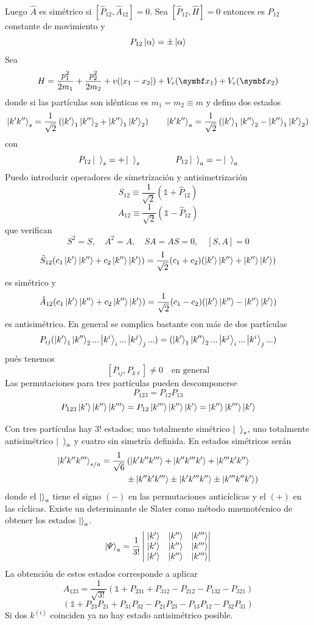 \documentclass[10pt,oneside]{CBFT_book}
\begin{document}
Luego $\hat{A}$ es simétrico si $[\hat{P}_{12},\hat{A}_{12}]=0$. Sea $[\hat{P}_{12},\hat{H}]=0$ entonces es 
$P_{12}$ constante de movimiento y 
\[
	P_{12} \Ket{\alpha} = \pm \Ket{\alpha}
\]
Sea 
\[
	H = \frac{p_1^2}{2m_1} + \frac{p_2^2}{2m_2} + v(|x_1 - x_2|) + V_e(\vb{x}_1)+ V_e(\vb{x}_2)
\]
donde si las partículas son idénticas es $m_1=m_2\equiv m$ y defino dos estados
\[
	\Ket{k' k''}_s = \frac{1}{\sqrt{2}}\left( \Ket{k'}_1\Ket{k''}_2 + \Ket{k''}_1\Ket{k'}_2 \right) \qquad 
	\Ket{k' k''}_a = \frac{1}{\sqrt{2}}\left( \Ket{k'}_1\Ket{k''}_2 - \Ket{k''}_1\Ket{k'}_2 \right)
\]
con 
\[
	P_{12}\Ket{\phantom{k}}_s = + \Ket{\phantom{k}}_s \qquad \qquad 
	P_{12}\Ket{\phantom{k}}_a = - \Ket{\phantom{k}}_a
\]
Puedo introducir operadores de simetrización y antisimetrización 
\[
	\hat{S}_{12} \equiv \frac{1}{\sqrt{2}} \left( \mathbb{1} + \hat{P}_{12} \right)
\]
\[
	\hat{A}_{12} \equiv \frac{1}{\sqrt{2}} \left( \mathbb{1} - \hat{P}_{12} \right)
\]
que verifican 
\[
	S^2 = S, \quad  A^2= A, \quad SA=AS=0, \quad [S,A] = 0
\]
\[
	\hat{S}_{12} (c_1\Ket{k'}\Ket{k''} + c_2\Ket{k''}\Ket{k'} ) = \frac{1}{\sqrt{2}}(c_1+c_2)
	(\Ket{k'}\Ket{k''} + \Ket{k''}\Ket{k'} )
\]
es simétrico y 
\[
	\hat{A}_{12} (c_1\Ket{k'}\Ket{k''} + c_2\Ket{k''}\Ket{k'} ) = \frac{1}{\sqrt{2}}(c_1-c_2)
	(\Ket{k'}\Ket{k''} - \Ket{k''}\Ket{k'} )
\]
es antisimétrico.
En general se complica bastante con más de dos partículas 
\[
	P_{ij}(\Ket{k'}_1\Ket{k''}_2...\Ket{k^i}_i...\Ket{k^j}_j...) =
	(\Ket{k'}_1\Ket{k''}_2...\Ket{k^j}_i...\Ket{k^i}_j...)
\]
pués tenemos 
\[
	[P_{ij},P_{k\ell}] \neq 0 \quad \text{en general}
\]
Las permutaciones para tres partículas pueden descomponerse 
\[
	P_{123} = P_{12}P_{13} 
\]
\[
	P_{123}\Ket{k'}\Ket{k''}\Ket{k'''} = P_{12}\Ket{k'''}\Ket{k''}\Ket{k'} = \Ket{k''}\Ket{k'''}\Ket{k'}
\]

Con tres partículas hay $3!$ estados; uno totalmente simétrico $\Ket{\phantom{k}}_s$, uno totalmente antisimétrico 
$\Ket{\phantom{k}}_a$ y cuatro sin simetría definida.
En estados simétricos serán 
\begin{align*}
	\Ket{k'k''k'''}_{s/a} = \frac{1}{\sqrt{6}}&\left( \Ket{k'k''k'''} +  \Ket{k''k'''k'} + \Ket{k'''k'k''}\right. \\
	& \left. \pm \Ket{k''k'k'''} \pm \Ket{k'k'''k''} \pm \Ket{k'''k''k'} \right)
\end{align*}
donde el $\Ket{}_a$ tiene el signo $(-)$ en las permutaciones anticíclicas y el $(+)$ en las cíclicas.
Existe un determinante de Slater como método mnemotécnico de obtener los estados $\Ket{}_a$.
\[
	\Ket{ \Psi }_a = \frac{1}{3!}\begin{vmatrix} \; \Ket{k'} & \Ket{k''} & \Ket{k'''} \\  
	\; \Ket{k'} & \Ket{k''} & \Ket{k'''} \\ \; \Ket{k'} & \Ket{k''} & \Ket{k'''} \end{vmatrix}
\]
La obtención de estos estados corresponde a aplicar 
\[
	A_{123} = \frac{1}{\sqrt{3!}}\left( \mathbb{1} + P_{231} + P_{312} - P_{212} - P_{132} - P_{321} \right)
\]
\[
	( \mathbb{1} + P_{23}P_{21} + P_{31}P_{32} - P_{21}P_{23} - P_{13}P_{12} - P_{32}P_{31} )
\]
Si dos $k^{(i)}$ coinciden ya no hay estado antisimétrico posible.
\end{document}

